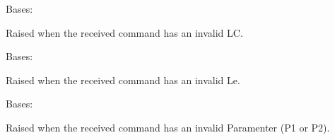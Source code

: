 \documentclass[letterpaper,10pt,english]{sphinxmanual}
\begin{document}

\begin{fulllineitems}
\label{\detokenize{aliro_actuator.access_protocol.errors:aliro_actuator.access_protocol.errors.InvalidLcError}}
\pysigstartsignatures
{}
\pysigstopsignatures
\sphinxAtStartPar
Bases: {\hyperref[\detokenize{aliro_actuator.access_protocol.errors:aliro_actuator.access_protocol.errors.InvalidCommandError}]{}}

\sphinxAtStartPar
Raised when the received command has an invalid LC.

\end{fulllineitems}


\begin{fulllineitems}
\label{\detokenize{aliro_actuator.access_protocol.errors:aliro_actuator.access_protocol.errors.InvalidLeError}}
\pysigstartsignatures
{}
\pysigstopsignatures
\sphinxAtStartPar
Bases: {\hyperref[\detokenize{aliro_actuator.access_protocol.errors:aliro_actuator.access_protocol.errors.InvalidCommandError}]{}}

\sphinxAtStartPar
Raised when the received command has an invalid Le.

\end{fulllineitems}


\begin{fulllineitems}
\label{\detokenize{aliro_actuator.access_protocol.errors:aliro_actuator.access_protocol.errors.InvalidParameterError}}
\pysigstartsignatures
{}
\pysigstopsignatures
\sphinxAtStartPar
Bases: {\hyperref[\detokenize{aliro_actuator.access_protocol.errors:aliro_actuator.access_protocol.errors.InvalidCommandError}]{}}

\sphinxAtStartPar
Raised when the received command has an invalid Paramenter (P1 or P2).

\end{fulllineitems}
\end{document}
